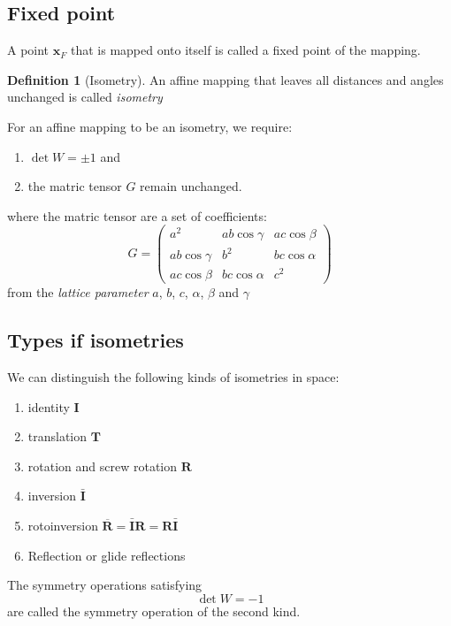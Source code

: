 \documentclass{amsart}
\newcommand{\bfx}{\mathbf{x}}
\theoremstyle{remark}
\theoremstyle{remark}
\theoremstyle{definition}
\newtheorem*{definition}{Definition}
\begin{document}
\subsection*{Fixed point} A point $\bfx_F$ that is mapped onto itself is called a fixed point of the mapping.

\vspace{10pt}

\begin{definition}
    [Isometry]
    An affine mapping that leaves all distances and angles unchanged is called \emph{isometry}
\end{definition}
For an affine mapping to be an isometry, we require: 
\begin{enumerate}
    \item $\det W = \pm 1$ and 
    \item the matric tensor $G$ remain unchanged.
\end{enumerate}
where the matric tensor are a set of coefficients:
\begin{equation*}
    G = \left(\begin{matrix}
        a^2 & ab\cos\gamma & ac\cos\beta \\
        ab\cos\gamma & b^2 & bc\cos\alpha \\
        ac\cos\beta & bc\cos\alpha & c^2 
    \end{matrix}\right)
\end{equation*}
from the \emph{lattice parameter} $a$, $b$, $c$, $\alpha$, $\beta$ and $\gamma$

\vspace{10pt}

\subsection*{Types if isometries}
We can distinguish the following kinds of isometries in space:
\begin{enumerate}
    \item identity $\mathbf{I}$
    \item translation $\mathbf{T}$
    \item rotation and screw rotation $\mathbf{R}$
    \item inversion $\bar{\mathbf{I}}$
    \item rotoinversion $\overline{\mathbf{R}} = \bar{\mathbf{I}} \mathbf{R} = \mathbf{R} \bar{\mathbf{I}}$
    \item Reflection or glide reflections
\end{enumerate}
The symmetry operations satisfying \[\det W = -1\] are called the symmetry operation of the second kind.
\end{document}
